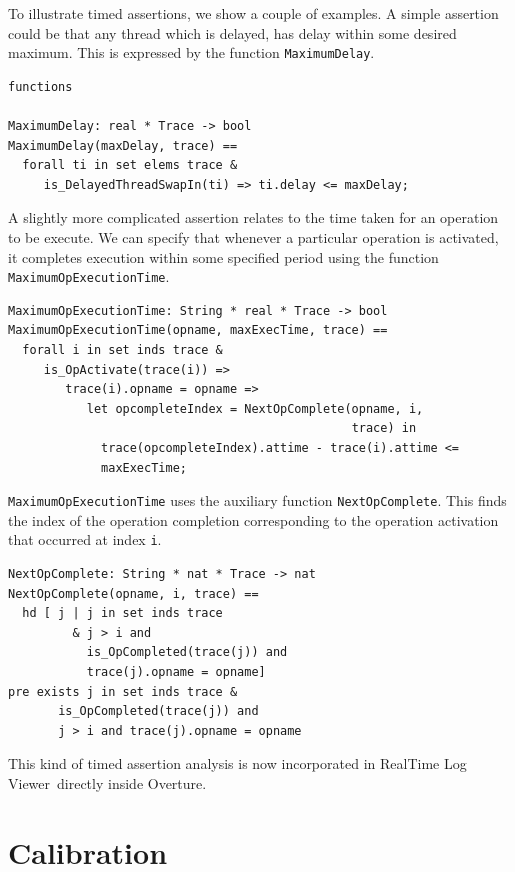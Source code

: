 \documentclass{overturerepchap}
\newcommand{\showtrace}{RealTime Log Viewer}
\begin{document}
To illustrate timed assertions, we show a couple of examples. A simple
assertion could be that any thread which is delayed, has delay within
some desired maximum. This is expressed by the function
\texttt{MaximumDelay}.

\begin{lstlisting}
functions

MaximumDelay: real * Trace -> bool
MaximumDelay(maxDelay, trace) ==
  forall ti in set elems trace &
     is_DelayedThreadSwapIn(ti) => ti.delay <= maxDelay;
\end{lstlisting}

A slightly more complicated assertion relates to the time taken for an
operation to be execute. We can specify that whenever a particular
operation is activated, it completes execution within some specified
period using the function \texttt{MaximumOpExecutionTime}.

\begin{lstlisting}
MaximumOpExecutionTime: String * real * Trace -> bool
MaximumOpExecutionTime(opname, maxExecTime, trace) ==
  forall i in set inds trace &
     is_OpActivate(trace(i)) =>
        trace(i).opname = opname =>
           let opcompleteIndex = NextOpComplete(opname, i,
                                                trace) in
             trace(opcompleteIndex).attime - trace(i).attime <= 
             maxExecTime;
\end{lstlisting}

\texttt{MaximumOpExecutionTime} uses the auxiliary function
\texttt{NextOpComplete}. This finds the index of the operation
completion corresponding to the operation activation that occurred at
index \texttt{i}.

\begin{lstlisting}
NextOpComplete: String * nat * Trace -> nat
NextOpComplete(opname, i, trace) ==
  hd [ j | j in set inds trace
         & j > i and
           is_OpCompleted(trace(j)) and 
           trace(j).opname = opname]
pre exists j in set inds trace & 
       is_OpCompleted(trace(j)) and
       j > i and trace(j).opname = opname
\end{lstlisting}

This kind of timed assertion analysis is now incorporated in  
\showtrace\ directly inside Overture.

\section{Calibration}
\end{document}
